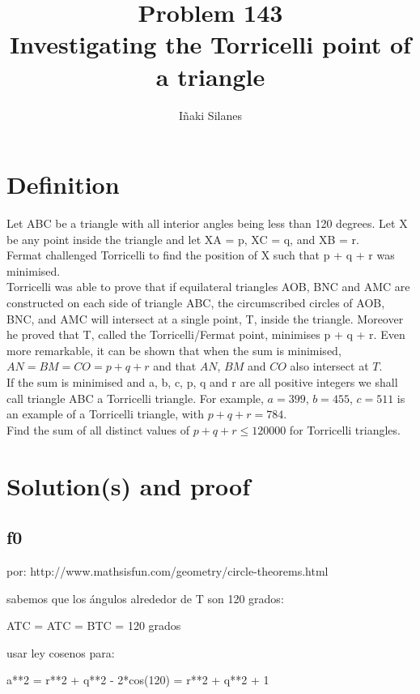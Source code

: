 \documentclass[english]{article}
\begin{document}
\newcommand{\mc}{\multicolumn}
\newcommand{\mr}{\multirow}
\newcommand{\cw}{\columnwidth}
\newcommand{\ig}[2]{\texttt{[image: \#2]}}

\title{Problem 143\\Investigating the Torricelli point of a triangle}
\author{I\~naki Silanes}
\maketitle

\section{Definition}

Let ABC be a triangle with all interior angles being less than 120 degrees. Let X be any point inside the triangle and let XA = p, XC = q, and XB = r.\\

Fermat challenged Torricelli to find the position of X such that p + q + r was minimised.\\

Torricelli was able to prove that if equilateral triangles AOB, BNC and AMC are constructed on each side of triangle ABC, the circumscribed circles of AOB, BNC, and AMC will intersect at a single point, T, inside the triangle. Moreover he proved that T, called the Torricelli/Fermat point, minimises p + q + r. Even more remarkable, it can be shown that when the sum is minimised, $AN = BM = CO = p + q + r$ and that $AN$, $BM$ and $CO$ also intersect at $T$.\\

If the sum is minimised and a, b, c, p, q and r are all positive integers we shall call triangle ABC a Torricelli triangle. For example, $a = 399$, $b = 455$, $c = 511$ is an example of a Torricelli triangle, with $p + q + r = 784$.\\

Find the sum of all distinct values of $p + q + r \leq 120000$ for Torricelli triangles.

\section{Solution(s) and proof}

\subsection{f0}

por:
http://www.mathsisfun.com/geometry/circle-theorems.html

sabemos que los ángulos alrededor de T son 120 grados:

ATC = ATC = BTC = 120 grados

usar ley cosenos para:

a**2 = r**2 + q**2 - 2*cos(120) = r**2 + q**2 + 1
\end{document}

